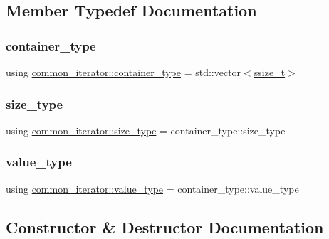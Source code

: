 \subsection{Member Typedef Documentation}
\mbox{\label{classcommon__iterator_a61d77b64fb74c43f016ce8cbde4b27c7}} 
\subsubsection{\texorpdfstring{container\_type}{container\_type}}
{\footnotesize\ttfamily using \mbox{\hyperlink{classcommon__iterator_a61d77b64fb74c43f016ce8cbde4b27c7}{common\+\_\+iterator\+::container\+\_\+type}} =  std\+::vector$<$\mbox{\hyperlink{detail_2common_8h_ac430d16fc097b3bf0a7469cfd09decda}{ssize\+\_\+t}}$>$}

\mbox{\label{classcommon__iterator_a1b9c8bc2b0275b8b9b6f5410b6f96148}} 
\subsubsection{\texorpdfstring{size\_type}{size\_type}}
{\footnotesize\ttfamily using \mbox{\hyperlink{classcommon__iterator_a1b9c8bc2b0275b8b9b6f5410b6f96148}{common\+\_\+iterator\+::size\+\_\+type}} =  container\+\_\+type\+::size\+\_\+type}

\mbox{\label{classcommon__iterator_ae5c71809ed30d20b321bf01f4043142e}} 
\subsubsection{\texorpdfstring{value\_type}{value\_type}}
{\footnotesize\ttfamily using \mbox{\hyperlink{classcommon__iterator_ae5c71809ed30d20b321bf01f4043142e}{common\+\_\+iterator\+::value\+\_\+type}} =  container\+\_\+type\+::value\+\_\+type}



\subsection{Constructor \& Destructor Documentation}
\mbox{\label{classcommon__iterator_a7e2266ddbeb3adb5d1cad2854cba952f}} 
